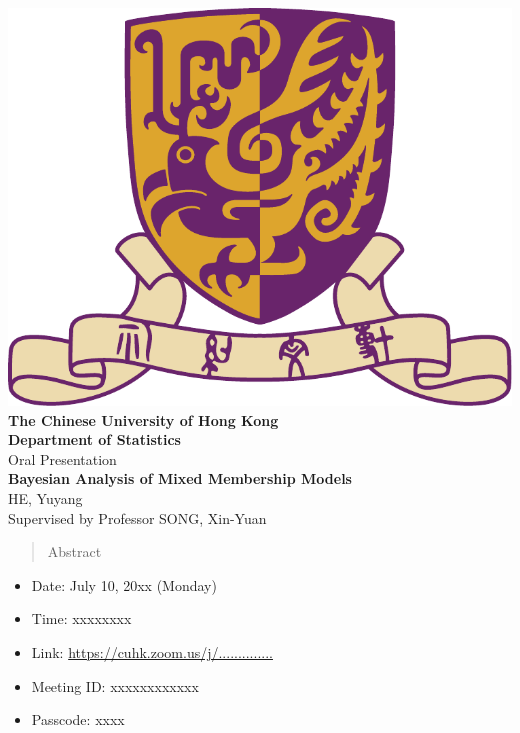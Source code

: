 \documentclass[11pt]{article}
\newcommand*{\mytitle}
{
	\begingroup
	\begin{center}
		\includegraphics[width=0.2\linewidth]{CUHK.pdf}\\[4ex]
		{\large \bfseries {The Chinese University of Hong Kong}}\\[2ex]
		{\large \bfseries {Department of Statistics}}\\[4ex]
		{\large {Oral Presentation}}\\[5ex]
		{\large \bfseries{Bayesian Analysis of Mixed Membership Models}}\\[2ex]
		{HE, Yuyang}\\[2ex]
		{Supervised by Professor SONG, Xin-Yuan}\\[4ex]
	\end{center}
	\endgroup
}
\begin{document}
	\thispagestyle{empty}
	\mytitle
	\begin{abstract}
		Abstract
	\end{abstract}
	\vskip 0.3in
	\begin{itemize}[label=]
		\item Date: July 10, 20xx (Monday)
		\item Time: xxxxxxxx
		\item Link: \url{https://cuhk.zoom.us/j/..............}
		\item Meeting ID: xxxxxxxxxxxx
		\item Passcode: xxxx
	\end{itemize}
\end{document}
